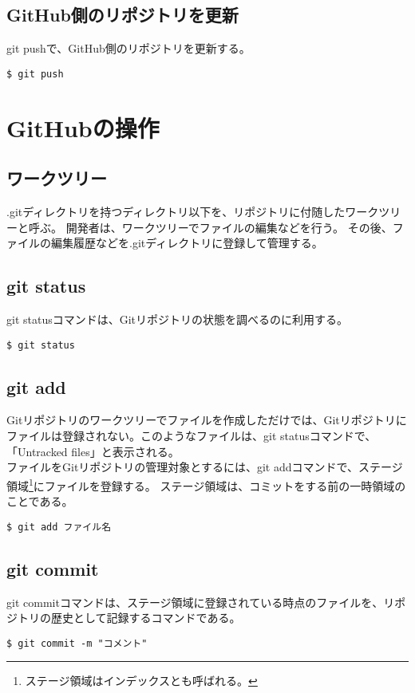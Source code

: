 \documentclass[11pt, oneside]{article}   	%
\begin{document}
\subsection{GitHub側のリポジトリを更新}
git pushで、GitHub側のリポジトリを更新する。
\begin{lstlisting}
$ git push
\end{lstlisting}


\section{GitHubの操作}
\subsection{ワークツリー}
.gitディレクトリを持つディレクトリ以下を、リポジトリに付随したワークツリーと呼ぶ。
開発者は、ワークツリーでファイルの編集などを行う。
その後、ファイルの編集履歴などを.gitディレクトリに登録して管理する。\\

\subsection{git status}
git statusコマンドは、Gitリポジトリの状態を調べるのに利用する。
\begin{lstlisting}
$ git status
\end{lstlisting}

\subsection{git add}
Gitリポジトリのワークツリーでファイルを作成しただけでは、Gitリポジトリにファイルは登録されない。このようなファイルは、git statusコマンドで、「Untracked files」と表示される。\\
ファイルをGitリポジトリの管理対象とするには、git addコマンドで、ステージ領域\footnote{ステージ領域はインデックスとも呼ばれる。}にファイルを登録する。
ステージ領域は、コミットをする前の一時領域のことである。
\begin{lstlisting}
$ git add ファイル名
\end{lstlisting}

\subsection{git commit}
git commitコマンドは、ステージ領域に登録されている時点のファイルを、リポジトリの歴史として記録するコマンドである。
\begin{lstlisting}
$ git commit -m "コメント"
\end{lstlisting}
\end{document}
